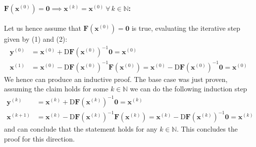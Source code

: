 \documentclass{article}
\newcommand\xk{\mathbf{x}^{\left(k\right)}}
\newcommand\xkn{\mathbf{x}^{\left(k+1\right)}}
\newcommand\yk{\mathbf{y}^{\left(k\right)}}
\newcommand\xn{\mathbf{x}^{\left(0\right)}}
\newcommand\yn{\mathbf{y}^{\left(0\right)}}
\newcommand\xo{\mathbf{x}^{\left(1\right)}}
\begin{document}
\paragraph{$\mathbf{F}\left(\mathbf{x}^{\left(0\right)}\right) = \mathbf{0} \implies \xk = \mathbf{x}^{\left(0\right)} \: \forall\, k \in \mathbb{N}$:} Let us hence assume that $\mathbf{F}\left(\mathbf{x}^{\left(0\right)}\right) = \mathbf{0}$ is true, evaluating the iterative step given by (1) and (2):
\begin{align*}
    \yn &= \xn + \mathrm{D}\mathbf{F}\left(\xn\right)^{-1} \mathbf{0} = \xn \\
    \xo &= \xn - \mathrm{D}\mathbf{F}\left(\xn\right)^{-1} \mathbf{F}\left(\xn\right) = \xn - \mathrm{D}\mathbf{F}\left(\xn\right)^{-1} \mathbf{0} = \xn 
\end{align*}
We hence can produce an inductive proof. The base case was just proven, assuming the claim holds for some $k \in \mathbb{N}$ we can do the following induction step 
\begin{align*}
    \yk &= \xk + \mathrm{D}\mathbf{F}\left(\xk\right)^{-1} \mathbf{0} = \xk \\
    \xkn &= \xk - \mathrm{D}\mathbf{F}\left(\xk\right)^{-1} \mathbf{F}\left(\xk\right) = \xk - \mathrm{D}\mathbf{F}\left(\xk\right)^{-1} \mathbf{0} = \xk 
\end{align*}
and can conclude that the statement holds for any $k \in \mathbb{N}$. This concludes the proof for this direction.

\pagebreak
\end{document}
